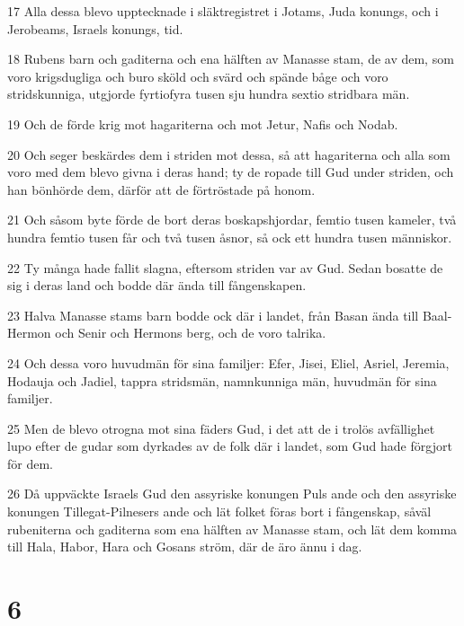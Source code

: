 \par 17 Alla dessa blevo upptecknade i släktregistret i Jotams, Juda konungs, och i Jerobeams, Israels konungs, tid.
\par 18 Rubens barn och gaditerna och ena hälften av Manasse stam, de av dem, som voro krigsdugliga och buro sköld och svärd och spände båge och voro stridskunniga, utgjorde fyrtiofyra tusen sju hundra sextio stridbara män.
\par 19 Och de förde krig mot hagariterna och mot Jetur, Nafis och Nodab.
\par 20 Och seger beskärdes dem i striden mot dessa, så att hagariterna och alla som voro med dem blevo givna i deras hand; ty de ropade till Gud under striden, och han bönhörde dem, därför att de förtröstade på honom.
\par 21 Och såsom byte förde de bort deras boskapshjordar, femtio tusen kameler, två hundra femtio tusen får och två tusen åsnor, så ock ett hundra tusen människor.
\par 22 Ty många hade fallit slagna, eftersom striden var av Gud. Sedan bosatte de sig i deras land och bodde där ända till fångenskapen.
\par 23 Halva Manasse stams barn bodde ock där i landet, från Basan ända till Baal-Hermon och Senir och Hermons berg, och de voro talrika.
\par 24 Och dessa voro huvudmän för sina familjer: Efer, Jisei, Eliel, Asriel, Jeremia, Hodauja och Jadiel, tappra stridsmän, namnkunniga män, huvudmän för sina familjer.
\par 25 Men de blevo otrogna mot sina fäders Gud, i det att de i trolös avfällighet lupo efter de gudar som dyrkades av de folk där i landet, som Gud hade förgjort för dem.
\par 26 Då uppväckte Israels Gud den assyriske konungen Puls ande och den assyriske konungen Tillegat-Pilnesers ande och lät folket föras bort i fångenskap, såväl rubeniterna och gaditerna som ena hälften av Manasse stam, och lät dem komma till Hala, Habor, Hara och Gosans ström, där de äro ännu i dag.

\chapter{6}

